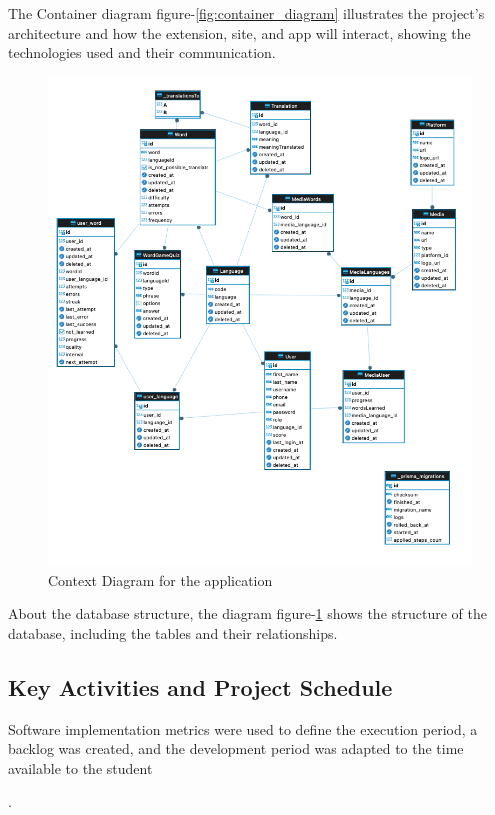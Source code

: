 \documentclass[12pt]{article}
\begin{document}
The Container diagram figure-\ref{fig:container_diagram} illustrates the project's architecture and how the extension, site, and app will interact, showing the technologies used and their communication.

\begin{figure}[h]
  \centering
  \caption{
  Context Diagram for the application
  }
  \label{fig:database_diagram}
  \includegraphics[width=1\textwidth]{assets/23.png}
\end{figure}

About the database structure, the diagram figure-\ref{fig:database_diagram} shows the structure of the database, including the tables and their relationships.

\subsection{Key Activities and Project Schedule}

Software implementation metrics were used to define the execution period, a backlog was created, and the development period was adapted to the time available to the student \author{J. Emanuel Cascone R. S.}.
\end{document}

